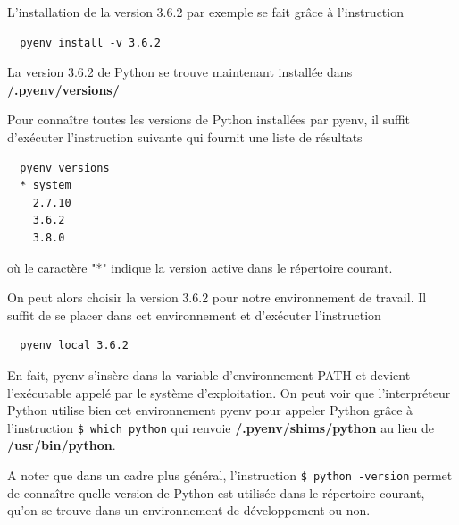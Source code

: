 \documentclass[twoside,a4paper,11pt,frenchb,openany]{report}
\begin{document}
L'installation de la version 3.6.2 par exemple se fait grâce à l'instruction
\begin{verbatim}  pyenv install -v 3.6.2\end{verbatim}

La version 3.6.2 de Python se trouve maintenant installée dans \textbf{\raisebox{-1ex}{\textasciitilde}/.pyenv/versions/}

Pour connaître toutes les versions de Python installées par pyenv, il suffit d'exécuter l'instruction suivante qui fournit une liste de résultats
\begin{verbatim}  pyenv versions
  * system
    2.7.10
    3.6.2
    3.8.0\end{verbatim}
où le caractère "*" indique la version active dans le répertoire courant.

On peut alors choisir la version 3.6.2 pour notre environnement de travail. Il suffit de se placer dans cet environnement et d'exécuter l'instruction
\begin{verbatim}  pyenv local 3.6.2\end{verbatim}

En fait, pyenv s'insère dans la variable d'environnement PATH et devient l'exécutable appelé par le système d'exploitation. On peut voir que l'interpréteur Python utilise bien cet environnement pyenv pour appeler Python grâce à l'instruction
\texttt{\$ which python}
qui renvoie \textbf{\raisebox{-1ex}{\textasciitilde}/.pyenv/shims/python} au lieu de \textbf{/usr/bin/python}.

A noter que dans un cadre plus général, l'instruction
\texttt{\$ python \textemdash-version}
permet de connaître quelle version de Python est utilisée dans le répertoire courant, qu'on se trouve dans un environnement de développement ou non.
\end{document}
